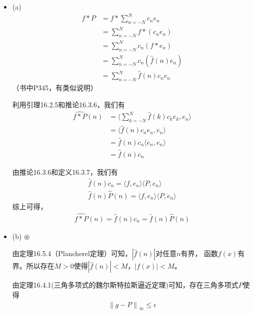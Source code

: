 \documentclass{article}
\begin{document}
\begin{itemize}
  \item (a)
        \begin{align*}
          f \ast P & = f \ast \sum\limits_{n = -N}^N c_n e_n       \\
                   & = \sum\limits_{n = -N}^N f \ast (c_n e_n)     \\
                   & = \sum\limits_{n = -N}^N c_n (f \ast e_n)     \\
                   & = \sum\limits_{n = -N}^N c_n (\hat{f}(n) e_n) \\
                   & = \sum\limits_{n = -N}^N \hat{f}(n) c_n e_n
        \end{align*}
        （书中P345，有类似说明）

        利用引理16.2.5和推论16.3.6，我们有
        \begin{align*}
          \widehat{f \ast P}(n) & = \langle \sum\limits_{k = -N}^N \hat{f}(k) c_k e_k, e_n \rangle \\
                                & = \langle \hat{f}(n) c_n e_n, e_n \rangle                        \\
                                & = \hat{f}(n) c_n \langle e_n, e_n \rangle                        \\
                                & = \hat{f}(n) c_n
        \end{align*}

        由推论16.3.6和定义16.3.7，我们有
        \begin{align*}
          \hat{f}(n) c_n = \langle f, e_n \rangle \langle P, e_n \rangle \\
          \hat{f}(n) \hat{P}(n) = \langle f, e_n \rangle \langle P, e_n \rangle
        \end{align*}
        综上可得，
        \begin{align*}
          \widehat{f \ast P}(n) = \hat{f}(n) c_n = \hat{f}(n) \hat{P}(n)
        \end{align*}

  \item (b) $\circledast$

        由定理16.5.4（Plancherel定理）可知，$|\hat{f}(n)|$对任意$n$有界，
        函数$f(x)$有界。所以存在$M > 0$使得$|\hat{f}(n)| < M$，$|f(x)| < M$。

        由定理16.4.1(三角多项式的魏尔斯特拉斯逼近定理)可知，存在三角多项式$P$使得
        \begin{align*}
          \left\|g - P\right\|_{\infty} \leq \epsilon
        \end{align*}


\end{itemize}
\end{document}
